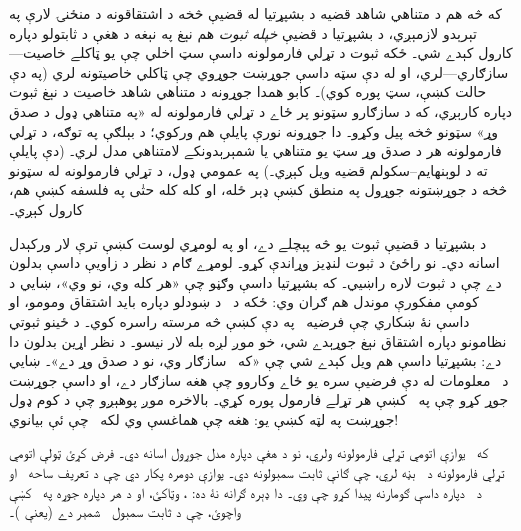 \documentclass[12pt,a4paper,oneside]{report}
\newcommand{\olfileid}[3]{\gdef\pspart{#1}\gdef\pschapter{#2}\gdef\pssection{#3}}
\gdef\pspart{#2}\gdef\pschapter{#3}\gdef\pssection{}%
\theoremstyle{definition}
\begin{document}
\label{olpseg:OLP-0127-B009:start}
که څه هم د متناهي شاهد قضيه د بشپړتيا له قضيې څخه د
اشتقاقونه د منځنۍ لارې په تېرېدو لازمېږي، د بشپړتيا د قضيې
\emph{خپله ثبوت} هم نېغ په نېغه د هغې د ثابتولو دپاره کارول کېدے
شي۔ ځکه ثبوت د تړلي فارمولونه داسې سټ اخلي چې يو ټاکلے خاصيت---
سازګاري---لري، او له دې سټه داسې جوړښت جوړوي چې ټاکلي
خاصيتونه لري (په دې حالت کښې، سټ پوره کوي)۔ کابو همدا جوړونه د
متناهي شاهد خاصيت د نېغ ثبوت دپاره کارېږي، که د سازګارو سټونو پر
ځاے د تړلي فارمولونه له «په متناهي ډول د صدق وړ» سټونو څخه پيل
وکړو۔
دا جوړونه نورې پايلې هم ورکوي؛ د بېلګې په توګه، د
  تړلي فارمولونه هر د صدق وړ سټ يو متناهي يا شمېرېدونکے لامتناهي مدل
  لري۔ (دې پايلې ته د لوېنهايم--سکولم قضيه ويل کېږي۔) په عمومي ډول،
  د تړلي فارمولونه له سټونو څخه د جوړښتونه جوړول په منطق کښې
  ډېر ځله، او کله کله حتٰی په فلسفه کښې هم، کارول کېږي۔
\label{olpseg:OLP-0127-B009:end}

\label{olpseg:OLP-0128-B004:start}
\olfileid{fol}{com}{out}
\label{olpseg:OLP-0128-B004:end}

\label{olpseg:OLP-0128-B005:start}
\label{olpseg:OLP-0128-B005:end}

\label{olpseg:OLP-0128-B006:start}
د بشپړتيا د قضيې ثبوت يو څه پېچلے دے، او په لومړي لوست کښې ترې
لار ورکېدل اسانه دي۔ نو راځئ د ثبوت لنډيز وړاندې کړو۔ لومړے ګام د
نظر د زاويې داسې بدلون دے چې د ثبوت لاره راښيي۔ که بشپړتيا داسې
وګڼو چې «هر کله  وي، نو
 وي»، ښايي د کومې مفکورې موندل هم ګران وي:
ځکه د~ د ښودلو دپاره بايد اشتقاق
ومومو، او داسې نۀ ښکاري چې فرضيه~ په دې کښې
څه مرسته راسره کوي۔ د ځينو ثبوتي نظامونو دپاره اشتقاق
نېغ جوړېدے شي، خو موږ لږه بله لار نيسو۔ د نظر اړين بدلون دا دے:
بشپړتيا داسې هم ويل کېدے شي چې «که~\LR{$\Gamma$} سازګار وي، نو د صدق
وړ دے»۔ ښايي د~\LR{$\Gamma$} معلومات له دې فرضيې سره يو ځاے وکاروو چې
هغه سازګار دے، او داسې جوړښت
جوړ کړو چې په~\LR{$\Gamma$} کښې هر
تړلے فارمول پوره کړي۔ بالاخره موږ پوهېږو
چې د کوم ډول جوړښت په لټه کښې
يو: هغه چې هماغسې وي لکه~\LR{$\Gamma$} چې ئې بيانوي!{}
\label{olpseg:OLP-0128-B006:end}

\label{olpseg:OLP-0128-B007:start}
که~\LR{$\Gamma$} يوازې اتومي
  تړلي فارمولونه ولري، نو د هغې دپاره
مدل جوړول اسانه دي۔ فرض کړئ ټولې اتومي تړلي فارمولونه
  د~ بڼه لري، چې  ګانې
  ثابت سمبولونه دي۔ يوازې دومره پکار دي چې
%
  د تعريف ساحه~ او د~ دپاره داسې ګومارنه پيدا کړو چې
   وي۔ دا ډېره ګرانه نۀ ده:
  ،  وټاکئ، او د هر
   دپاره جوړه
   په~ کښې واچوئ، چې
   د ثابت سمبول~ شمېر دے (يعنې
  )۔
\label{olpseg:OLP-0128-B007:end}
\end{document}
